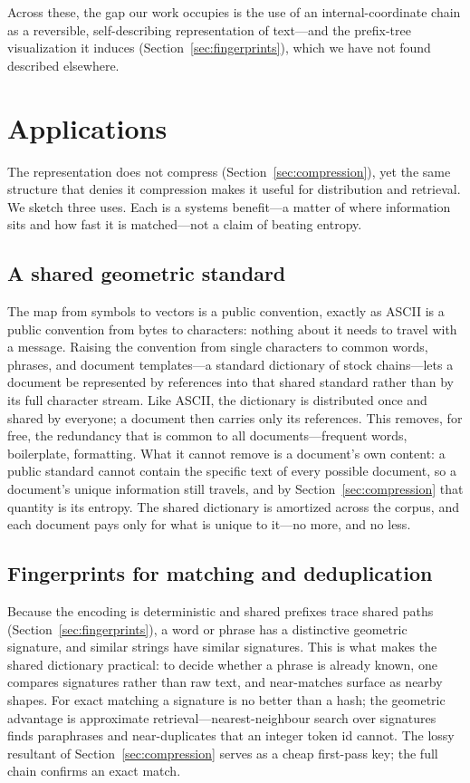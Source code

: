 \documentclass[11pt]{article}
\begin{document}
Across these, the gap our work occupies is the use of an internal-coordinate chain as a
reversible, self-describing representation of text---and the prefix-tree visualization it
induces (Section~\ref{sec:fingerprints}), which we have not found described elsewhere.

\section{Applications}\label{sec:applications}

The representation does not compress (Section~\ref{sec:compression}), yet the same structure
that denies it compression makes it useful for distribution and retrieval. We sketch three
uses. Each is a systems benefit---a matter of where information sits and how fast it is
matched---not a claim of beating entropy.

\subsection{A shared geometric standard}

The map from symbols to vectors is a public convention, exactly as ASCII is a public
convention from bytes to characters: nothing about it needs to travel with a message. Raising
the convention from single characters to common words, phrases, and document templates---a
standard dictionary of stock chains---lets a document be represented by references into that
shared standard rather than by its full character stream. Like ASCII, the dictionary is
distributed once and shared by everyone; a document then carries only its references. This
removes, for free, the redundancy that is common to all documents---frequent words,
boilerplate, formatting. What it cannot remove is a document's own content: a public standard
cannot contain the specific text of every possible document, so a document's unique
information still travels, and by Section~\ref{sec:compression} that quantity is its entropy.
The shared dictionary is amortized across the corpus, and each document pays only for what is
unique to it---no more, and no less.

\subsection{Fingerprints for matching and deduplication}

Because the encoding is deterministic and shared prefixes trace shared paths
(Section~\ref{sec:fingerprints}), a word or phrase has a distinctive geometric signature, and
similar strings have similar signatures. This is what makes the shared dictionary practical:
to decide whether a phrase is already known, one compares signatures rather than raw text, and
near-matches surface as nearby shapes. For exact matching a signature is no better than a
hash; the geometric advantage is approximate retrieval---nearest-neighbour search over
signatures finds paraphrases and near-duplicates that an integer token id cannot. The lossy
resultant of Section~\ref{sec:compression} serves as a cheap first-pass key; the full chain
confirms an exact match.
\end{document}
